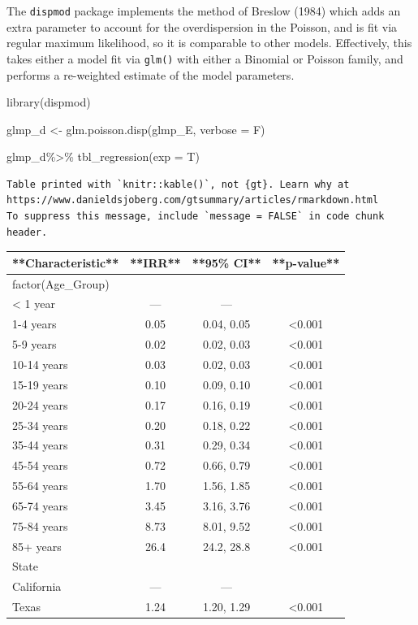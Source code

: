 \documentclass[
  letterpaper,
  DIV=11,
  numbers=noendperiod]{scrreprt}
\newenvironment{Shaded}{\begin{snugshade}}{\end{snugshade}}
\newcommand{\AttributeTok}[1]{\textcolor[rgb]{0.40,0.45,0.13}{#1}}
\newcommand{\FunctionTok}[1]{\textcolor[rgb]{0.28,0.35,0.67}{#1}}
\newcommand{\NormalTok}[1]{\textcolor[rgb]{0.00,0.23,0.31}{#1}}
\newcommand{\OtherTok}[1]{\textcolor[rgb]{0.00,0.23,0.31}{#1}}
\newcommand{\SpecialCharTok}[1]{\textcolor[rgb]{0.37,0.37,0.37}{#1}}
\begin{document}
The \texttt{dispmod} package implements the method of Breslow (1984)
which adds an extra parameter to account for the overdispersion in the
Poisson, and is fit via regular maximum likelihood, so it is comparable
to other models. Effectively, this takes either a model fit via
\texttt{glm()} with either a Binomial or Poisson family, and performs a
re-weighted estimate of the model parameters.

\begin{Shaded}
\begin{Highlighting}[]
\FunctionTok{library}\NormalTok{(dispmod)}

\NormalTok{glmp\_d }\OtherTok{\textless{}{-}} \FunctionTok{glm.poisson.disp}\NormalTok{(glmp\_E,}
                           \AttributeTok{verbose =}\NormalTok{ F)}

\NormalTok{glmp\_d}\SpecialCharTok{\%\textgreater{}\%}
  \FunctionTok{tbl\_regression}\NormalTok{(}\AttributeTok{exp =}\NormalTok{ T)}
\end{Highlighting}
\end{Shaded}

\begin{verbatim}
Table printed with `knitr::kable()`, not {gt}. Learn why at
https://www.danieldsjoberg.com/gtsummary/articles/rmarkdown.html
To suppress this message, include `message = FALSE` in code chunk header.
\end{verbatim}

\begin{tabular}{l|c|c|c}
\hline
**Characteristic** & **IRR** & **95\% CI** & **p-value**\\
\hline
factor(Age\_Group) &  &  & \\
\hline
< 1 year & — & — & \\
\hline
1-4 years & 0.05 & 0.04, 0.05 & <0.001\\
\hline
5-9 years & 0.02 & 0.02, 0.03 & <0.001\\
\hline
10-14 years & 0.03 & 0.02, 0.03 & <0.001\\
\hline
15-19 years & 0.10 & 0.09, 0.10 & <0.001\\
\hline
20-24 years & 0.17 & 0.16, 0.19 & <0.001\\
\hline
25-34 years & 0.20 & 0.18, 0.22 & <0.001\\
\hline
35-44 years & 0.31 & 0.29, 0.34 & <0.001\\
\hline
45-54 years & 0.72 & 0.66, 0.79 & <0.001\\
\hline
55-64 years & 1.70 & 1.56, 1.85 & <0.001\\
\hline
65-74 years & 3.45 & 3.16, 3.76 & <0.001\\
\hline
75-84 years & 8.73 & 8.01, 9.52 & <0.001\\
\hline
85+ years & 26.4 & 24.2, 28.8 & <0.001\\
\hline
State &  &  & \\
\hline
California & — & — & \\
\hline
Texas & 1.24 & 1.20, 1.29 & <0.001\\
\hline
\end{tabular}
\end{document}
